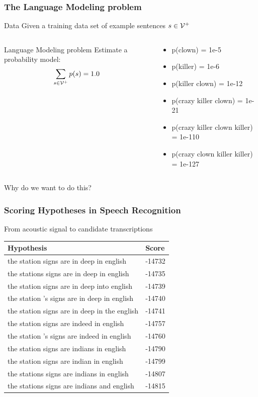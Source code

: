 \begin{frame}
\frametitle{The Language Modeling problem}
\begin{block}{Data}
Given a training data set of example sentences $s \in {\cal V}^+$
\end{block}
\pause
\begin{columns}
    \begin{block}{Language Modeling problem}
    Estimate a probability model:
    \[ \sum_{s \in {\cal V}^+} p(s) = 1.0 \]
    \end{block}
    \begin{block}{}
    \begin{itemize}
    \item p(clown) = 1e-5
    \item p(killer) = 1e-6
    \item {\small p(killer clown) = 1e-12}
    \item {\footnotesize p(crazy killer clown) = 1e-21}
    \item {\tiny p(crazy killer clown killer) = 1e-110}
    \item {\tiny p(crazy clown killer killer) = 1e-127}
    \end{itemize}
    \end{block}
\end{columns}
\begin{alertblock}{Why do we want to do this?}
\end{alertblock}
\end{frame}

\begin{frame}
\frametitle{Scoring Hypotheses in Speech Recognition}
\centering
\begin{block}{From acoustic signal to candidate transcriptions}
\begin{tabular}{ll}
\rowcolor{MidnightBlue!50}
Hypothesis & Score \\
\hline
the station signs are in deep in english & -14732 \\
the stations signs are in deep in english & -14735 \\
the station signs are in deep into english & -14739 \\
the station 's signs are in deep in english & -14740 \\
the station signs are in deep in the english & -14741 \\
the station signs are indeed in english & -14757 \\
the station 's signs are indeed in english & -14760 \\ 
the station signs are indians in english & -14790 \\
the station signs are indian in english & -14799 \\
the stations signs are indians in english & -14807 \\
the stations signs are indians and english & -14815 
\end{tabular}
\end{block}
\end{frame}

